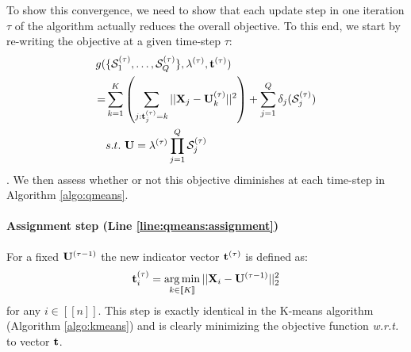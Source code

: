 


To show this convergence, we need to show that each update step in one iteration $\tau$ of the algorithm actually reduces the overall objective. To this end, we start by re-writing the objective at a given time-step $\tau$:
%
\begin{equation}
\begin{split}
\label{eq:qmean_problem_2}
    g(&\{ \mathcal{S}_1^{(\tau)}, \ldots,\mathcal{S}_Q^{(\tau)} \}, \lambda^{(\tau)}, {\mathbf{t}}^{(\tau)})\\
    = & \sum_{k=1}^{K} \left( \sum_{j: {\mathbf{t}}^{(\tau)}_j = k} ||{\mathbf{X}}_j - {\mathbf{U}}^{(\tau)}_k||^2 \right) + \sum_{j=1}^{Q} \delta_j(\mathcal{S}_j^{(\tau)})\\
    & s.t. ~ {\mathbf{U}} = \lambda^{(\tau)} \prod_{j=1}^{Q}{\mathcal{S}_j^{(\tau)}}
\end{split}
\end{equation}.
%
We then assess whether or not this objective diminishes at each time-step in Algorithm \ref{algo:qmeans}.




\paragraph{Assignment step (Line \ref{line:qmeans:assignment})} For a fixed ${\mathbf{U}}^{(\tau-1)}$ the new indicator vector ${\mathbf{t}}^{(\tau)}$ is defined as:
%
\begin{equation}
\label{eq:qmean_problem_U_fixed}
 {\mathbf{t}}^{(\tau)}_i = \operatorname*{arg\,min}_{k \in [\![K]\!]} ||{\mathbf{X}}_i - {\mathbf{U}}^{(\tau-1)}||_2^2
\end{equation}
%
for any $i \in [\![n]\!]$. This step is exactly identical in the K-means algorithm (Algorithm \ref{algo:kmeans}) and is clearly minimizing the objective function \textit{w.r.t.} to vector ${\mathbf{t}}$.

